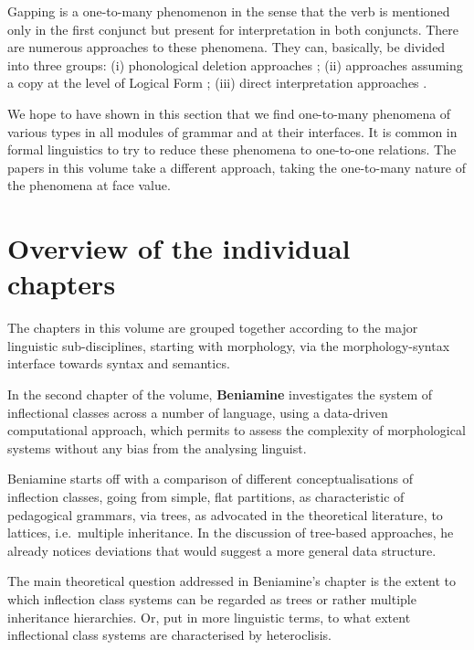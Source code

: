 \documentclass[output=paper]{langscibook}
\begin{document}
Gapping is a one-to-many phenomenon in the sense that the verb is mentioned only in the first conjunct but present for interpretation in both conjuncts.
There are numerous approaches to these phenomena. They can, basically, be divided into three groups: (i) phonological deletion approaches 
\citep{Merchant:01,Fox:Lasnik:03}; (ii) approaches assuming a copy at the level of Logical Form \citep{Lobeck:95,Chung:al:95%
}; 
(iii) direct interpretation approaches \citep{Ginzburg:Sag:00,Culicover:Jackendoff:05,Kubota:Levine:16-Gapping}. 
%



\bigskip\noindent
We hope to have shown in this section that we find one-to-many
phenomena of various types in all modules of grammar and at their
interfaces.  It is common in formal linguistics to try to reduce these
phenomena to one-to-one relations.  The papers in this volume take a
different approach, taking the one-to-many nature of the phenomena at
face value.

\section{Overview of the individual chapters}

The chapters in this volume are grouped together according to the
major linguistic sub-disciplines, starting with morphology, via the
morphology-syntax interface towards syntax and semantics.  

In the second chapter of the volume, \textbf{Beniamine} investigates
the system of inflectional classes across a number of language, using
a data-driven computational approach, which permits to assess the
complexity of morphological systems without any bias from the
analysing linguist.

Beniamine starts off with a comparison of different conceptualisations
of inflection classes, going from simple, flat partitions, as
characteristic of pedagogical grammars, via trees, as advocated in the
theoretical literature, to lattices, i.e.\  multiple
inheritance.  In the discussion of tree-based approaches, he already
notices deviations that would suggest a more general data
structure. 

The main theoretical question addressed in Beniamine's chapter is the
extent to which inflection class systems can be regarded as trees or
rather multiple inheritance hierarchies. Or, put in more linguistic
terms, to what extent inflectional class systems are characterised by
heteroclisis.
\end{document}
